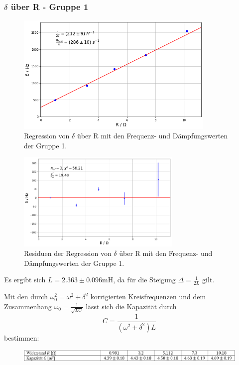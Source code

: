 \documentclass{beamer}
\begin{document}
\begin{frame}
\frametitle{$\delta$ über R - Gruppe 1}
\begin{figure}
\centering
\includegraphics[width=0.85\textwidth]{abbildungen/LCRegression.png}
\caption{Regression von $\delta$ über R mit den Frequenz- und Dämpfungswerten der Gruppe 1.}
\end{figure}

\end{frame}


\begin{frame}
\begin{figure}
\centering
\includegraphics[width=0.7\textwidth]{abbildungen/LCResiduen.png}
\caption{Residuen der Regression von $\delta$ über R mit den Frequenz- und Dämpfungswerten der Gruppe 1.}
\end{figure}
Es ergibt sich $L = 2.363 \pm 0.096$mH, da für die Steigung $\Delta = \frac{1}{2L}$ gilt.
\end{frame}

\begin{frame}
Mit den durch $\omega_0^2 = \omega^2 + \delta^2$ korrigierten Kreisfrequenzen und dem Zusammenhang $\omega_0 = \frac{1}{\sqrt{LC}}$ lässt sich die Kapazität durch 
$$ C = \frac{1}{(\omega^2 + \delta^2) L}$$
bestimmen:

\begin{figure}
\includegraphics[width = \textwidth]{abbildungen/1VCWerte_mod.PNG}
\end{figure}
\end{frame}
\end{document}
